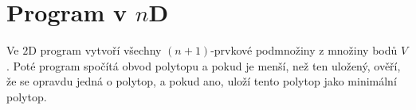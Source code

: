 \section{Program v \texorpdfstring{$n$D}{nD}}
\label{sec:program_nD}

Ve $2$D program vytvoří všechny $(n+1)$-prvkové podmnožiny z množiny bodů $V$. Poté program spočítá obvod polytopu a pokud je menší, než ten uložený, ověří, že se opravdu jedná o polytop, a pokud ano, uloží tento polytop jako minimální polytop.